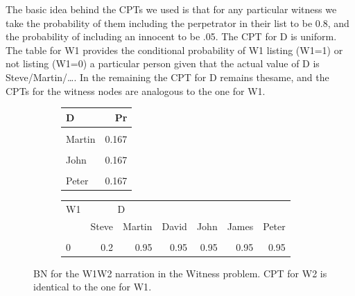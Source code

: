 \documentclass[10pt,]{scrartcl}
\begin{document}
The basic idea behind
the CPTs we used is that for any particular witness we take the
probability of them including the perpetrator in their list to be 0.8,
and the probability of including an innocent to be .05.  
The CPT for \textsf{D} is uniform. The table for \textsf{W1} provides
the conditional probability of \textsf{W1} listing (\textsf{W1}=1) or
not listing (\textsf{W1}=0) a particular person given that the actual
value of \textsf{D} is Steve/Martin/\dots.  In the
remaining  the CPT for \textsf{D} remains thesame, and the CPTs for the witness nodes are analogous to the one for \textsf{W1}. 





\begin{figure}

\begin{subfigure}[!ht]{0.3\textwidth}
\begin{table}[H]
\centering
\begin{tabular}{lr}
\toprule
D & Pr\\
\midrule
\cellcolor{gray!6}{Steve} & \cellcolor{gray!6}{0.167}\\
Martin & 0.167\\
\cellcolor{gray!6}{David} & \cellcolor{gray!6}{0.167}\\
John & 0.167\\
\cellcolor{gray!6}{James} & \cellcolor{gray!6}{0.167}\\
Peter & 0.167\\
\bottomrule
\end{tabular}
\end{table}
\end{subfigure}
\begin{subfigure}[!ht]{0.2\textwidth}
\begin{table}[H]
\centering\begin{table}[H]
\centering
\begin{tabular}{lrrrrrr}
\toprule
\multicolumn{1}{c}{W1} & \multicolumn{2}{c}{D} \\
  & Steve & Martin & David & John & James & Peter\\
\midrule
\cellcolor{gray!6}{\cellcolor{gray!6}{1}} & \cellcolor{gray!6}{\cellcolor{gray!6}{0.8}} & \cellcolor{gray!6}{\cellcolor{gray!6}{0.05}} & \cellcolor{gray!6}{\cellcolor{gray!6}{0.05}} & \cellcolor{gray!6}{\cellcolor{gray!6}{0.05}} & \cellcolor{gray!6}{\cellcolor{gray!6}{0.05}} & \cellcolor{gray!6}{\cellcolor{gray!6}{0.05}}\\
0 & 0.2 & 0.95 & 0.95 & 0.95 & 0.95 & 0.95\\
\bottomrule
\end{tabular}
\end{table}
\end{table}
\end{subfigure}
\caption{BN for the \textsf{W1W2} narration in the \textsf{Witness} problem. CPT for \textsf{W2} is identical to the one for \textsf{W1}.}
\label{fig:w1w2}
\end{figure}
\end{document}
